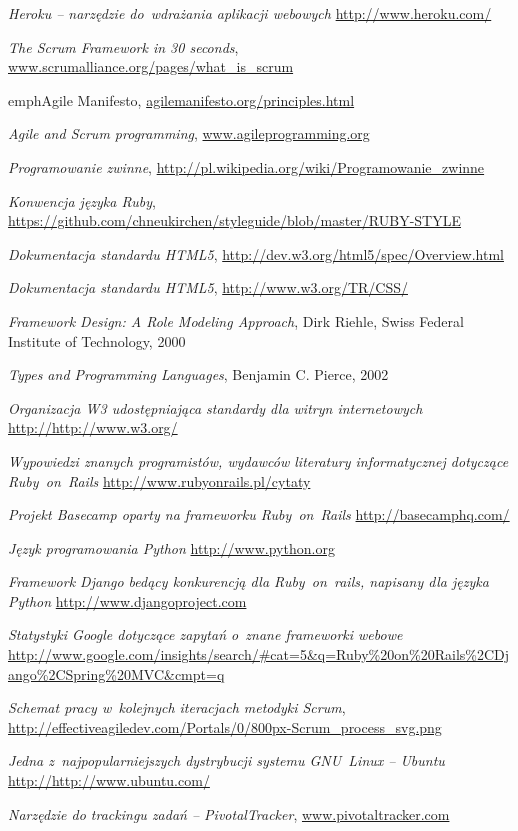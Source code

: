 \begin{thebibliography}{99}
   \emph{Heroku -- narzędzie do~wdrażania aplikacji webowych} \url{http://www.heroku.com/}

   \emph{The Scrum Framework in 30 seconds}, \url{www.scrumalliance.org/pages/what_is_scrum}

   emph{Agile Manifesto}, \url{agilemanifesto.org/principles.html}

   \emph{Agile and Scrum programming}, \url{www.agileprogramming.org}

   \emph{Programowanie zwinne}, \url{http://pl.wikipedia.org/wiki/Programowanie_zwinne}

   \emph{Konwencja języka Ruby}, \url{https://github.com/chneukirchen/styleguide/blob/master/RUBY-STYLE}

   \emph{Dokumentacja standardu HTML5}, \url{http://dev.w3.org/html5/spec/Overview.html}

   \emph{Dokumentacja standardu HTML5}, \url{http://www.w3.org/TR/CSS/}

   \emph{Framework Design: A Role Modeling Approach}, Dirk Riehle, Swiss Federal Institute of Technology, 2000

   \emph{Types and Programming Languages}, Benjamin C. Pierce, 2002

   \emph{Organizacja W3 udostępniająca standardy dla witryn internetowych} \url{http://http://www.w3.org/}

   \emph{Wypowiedzi znanych programistów, wydawców literatury informatycznej dotyczące Ruby~on~Rails} \url{http://www.rubyonrails.pl/cytaty}

   \emph{Projekt Basecamp oparty na frameworku Ruby~on~Rails} \url{http://basecamphq.com/}

   \emph{Język programowania Python} \url{http://www.python.org}

   \emph{Framework Django bedący konkurencją dla Ruby~on~rails, napisany dla języka Python} \url{http://www.djangoproject.com}

   \emph{Statystyki Google dotyczące zapytań o~znane frameworki webowe} \url{http://www.google.com/insights/search/\#cat=5\&q=Ruby\%20on\%20Rails\%2CDjango\%2CSpring\%20MVC\&cmpt=q}

   \emph{Schemat pracy w~kolejnych iteracjach metodyki Scrum}, \url{http://effectiveagiledev.com/Portals/0/800px-Scrum\_process\_svg.png}

   \emph{Jedna z~najpopularniejszych dystrybucji systemu GNU~Linux -- Ubuntu} \url{http://http://www.ubuntu.com/}

   \emph{Narzędzie do trackingu zadań -- PivotalTracker}, \url{www.pivotaltracker.com}

\end{thebibliography}

